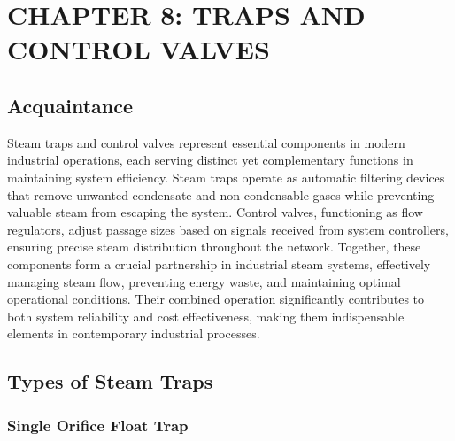 \section{CHAPTER 8: TRAPS AND CONTROL VALVES}
\subsection{Acquaintance}
Steam traps and control valves represent essential components in modern industrial operations, each serving distinct yet complementary functions in maintaining system efficiency. Steam traps operate as automatic filtering devices that remove unwanted condensate and non-condensable gases while preventing valuable steam from escaping the system. Control valves, functioning as flow regulators, adjust passage sizes based on signals received from system controllers, ensuring precise steam distribution throughout the network. Together, these components form a crucial partnership in industrial steam systems, effectively managing steam flow, preventing energy waste, and maintaining optimal operational conditions. Their combined operation significantly contributes to both system reliability and cost effectiveness, making them indispensable elements in contemporary industrial processes.

\subsection{Types of Steam Traps}
\subsubsection{Single Orifice Float Trap}

